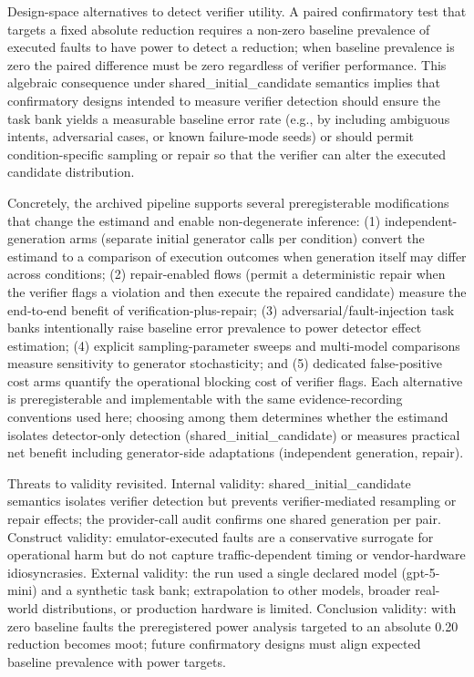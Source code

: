 \documentclass[conference]{IEEEtran}
\begin{document}
Design-space alternatives to detect verifier utility. A paired confirmatory test that targets a fixed absolute reduction requires a non-zero baseline prevalence of executed faults to have power to detect a reduction; when baseline prevalence is zero the paired difference must be zero regardless of verifier performance. This algebraic consequence under shared\_initial\_candidate semantics implies that confirmatory designs intended to measure verifier detection should ensure the task bank yields a measurable baseline error rate (e.g., by including ambiguous intents, adversarial cases, or known failure-mode seeds) or should permit condition-specific sampling or repair so that the verifier can alter the executed candidate distribution.

Concretely, the archived pipeline supports several preregisterable modifications that change the estimand and enable non-degenerate inference: (1) independent-generation arms (separate initial generator calls per condition) convert the estimand to a comparison of execution outcomes when generation itself may differ across conditions; (2) repair-enabled flows (permit a deterministic repair when the verifier flags a violation and then execute the repaired candidate) measure the end‑to‑end benefit of verification-plus-repair; (3) adversarial/fault-injection task banks intentionally raise baseline error prevalence to power detector effect estimation; (4) explicit sampling-parameter sweeps and multi-model comparisons measure sensitivity to generator stochasticity; and (5) dedicated false-positive cost arms quantify the operational blocking cost of verifier flags. Each alternative is preregisterable and implementable with the same evidence-recording conventions used here; choosing among them determines whether the estimand isolates detector-only detection (shared\_initial\_candidate) or measures practical net benefit including generator-side adaptations (independent generation, repair).

Threats to validity revisited. Internal validity: shared\_initial\_candidate semantics isolates verifier detection but prevents verifier-mediated resampling or repair effects; the provider-call audit confirms one shared generation per pair. Construct validity: emulator-executed faults are a conservative surrogate for operational harm but do not capture traffic-dependent timing or vendor-hardware idiosyncrasies. External validity: the run used a single declared model (gpt-5-mini) and a synthetic task bank; extrapolation to other models, broader real-world distributions, or production hardware is limited. Conclusion validity: with zero baseline faults the preregistered power analysis targeted to an absolute 0.20 reduction becomes moot; future confirmatory designs must align expected baseline prevalence with power targets.
\end{document}
